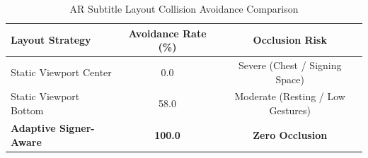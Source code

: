 \begin{table}[h]
\centering
\caption{AR Subtitle Layout Collision Avoidance Comparison}
\label{tab:signer_collision}
\begin{tabular}{lcc}
\hline
\textbf{Layout Strategy} & \textbf{Avoidance Rate (\%)} & \textbf{Occlusion Risk} \\
\hline
Static Viewport Center & 0.0 & Severe (Chest / Signing Space) \\
Static Viewport Bottom & 58.0 & Moderate (Resting / Low Gestures) \\
\textbf{Adaptive Signer-Aware} & \textbf{100.0} & \textbf{Zero Occlusion} \\
\hline
\end{tabular}
\end{table}
